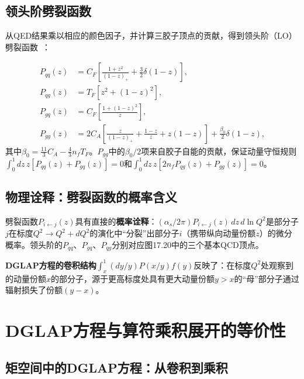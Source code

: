 \documentclass[12pt,a4paper]{ctexart}
\theoremstyle{definition}
\begin{document}
\subsection{领头阶劈裂函数}

从QED结果乘以相应的颜色因子，并计算三胶子顶点的贡献，得到领头阶（LO）劈裂函数~\cite{PeskinSchroeder1995,AltarelliParisi1977}：

\begin{align}
P_{qq}(z) &= C_F \left[ \frac{1+z^2}{(1-z)_+} + \frac{3}{2}\delta(1-z) \right], \label{eq:Pqq} \\[4pt]
P_{qg}(z) &= T_F \left[ z^2 + (1-z)^2 \right], \label{eq:Pqg} \\[4pt]
P_{gq}(z) &= C_F \left[ \frac{1+(1-z)^2}{z} \right], \label{eq:Pgq} \\[4pt]
P_{gg}(z) &= 2C_A \left[ \frac{z}{(1-z)_+} + \frac{1-z}{z} + z(1-z) \right] + \frac{\beta_0}{2}\delta(1-z), \label{eq:Pgg}
\end{align}
其中$\beta_0 = \frac{11}{3}C_A - \frac{4}{3}n_f T_F$。$P_{gg}$中的$\beta_0/2$项来自胶子自能的贡献，保证动量守恒规则$\int_0^1 dz\,z[P_{qq}(z)+P_{gq}(z)] = 0$和$\int_0^1 dz\,z[2n_f P_{qg}(z)+P_{gg}(z)] = 0$。

\subsection{物理诠释：劈裂函数的概率含义}

劈裂函数$P_{i\leftarrow j}(z)$具有直接的\textbf{概率诠释}：$(\alpha_s/2\pi)P_{i\leftarrow j}(z)\,dz\,d\ln Q^2$是部分子$j$在标度$Q^2\to Q^2+dQ^2$的演化中``分裂''出部分子$i$（携带纵向动量份额$z$）的微分概率。领头阶的$P_{qq}$、$P_{gq}$、$P_{qg}$分别对应图17.20中的三个基本QCD顶点。

\textbf{DGLAP方程的卷积结构}$\int_x^1 (dy/y) P(x/y) f(y)$反映了：在标度$Q^2$处观察到的动量份额$x$的部分子，源于更高标度处具有更大动量份额$y > x$的``母''部分子通过辐射损失了份额$(y-x)$。

\section{DGLAP方程与算符乘积展开的等价性}

\subsection{矩空间中的DGLAP方程：从卷积到乘积}
\end{document}
